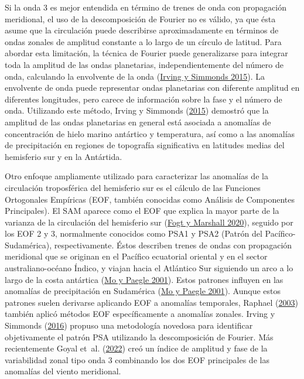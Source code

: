 \documentclass[12pt,oneside,a4paper]{reedthesis}
\begin{document}
Si la onda 3 es mejor entendida en término de trenes de onda con propagación meridional, el uso de la descomposición de Fourier no es válido, ya que ésta asume que la circulación puede describirse aproximadamente en términos de ondas zonales de amplitud constante a lo largo de un círculo de latitud.
Para abordar esta limitación, la técnica de Fourier puede generalizarse para integrar toda la amplitud de las ondas planetarias, independientemente del número de onda, calculando la envolvente de la onda (\protect\hyperlink{ref-irving2015}{Irving y Simmonds 2015}).
La envolvente de onda puede representar ondas planetarias con diferente amplitud en diferentes longitudes, pero carece de información sobre la fase y el número de onda.
Utilizando este método, Irving y Simmonds (\protect\hyperlink{ref-irving2015}{2015}) demostró que la amplitud de las ondas planetarias en general está asociada a anomalías de concentración de hielo marino antártico y temperatura, así como a las anomalías de precipitación en regiones de topografía significativa en latitudes medias del hemisferio sur y en la Antártida.

Otro enfoque ampliamente utilizado para caracterizar las anomalías de la circulación troposférica del hemisferio sur es el cálculo de las Funciones Ortogonales Empíricas (EOF, también conocidas como Análisis de Componentes Principales).
El SAM aparece como el EOF que explica la mayor parte de la varianza de la circulación del hemisferio sur (\protect\hyperlink{ref-fogt2020}{Fogt y Marshall 2020}), seguido por los EOF 2 y 3, normalmente conocidos como PSA1 y PSA2 (Patrón del Pacífico-Sudamérica), respectivamente.
Éstos describen trenes de ondas con propagación meridional que se originan en el Pacífico ecuatorial oriental y en el sector australiano-océano Índico, y viajan hacia el Atlántico Sur siguiendo un arco a lo largo de la costa antártica (\protect\hyperlink{ref-mo2001}{Mo y Paegle 2001}).
Estos patrones influyen en las anomalías de precipitación en Sudamérica (\protect\hyperlink{ref-mo2001}{Mo y Paegle 2001}).
Aunque estos patrones suelen derivarse aplicando EOF a anomalías temporales, Raphael (\protect\hyperlink{ref-raphael2003}{2003}) también aplicó métodos EOF específicamente a anomalías zonales.
Irving y Simmonds (\protect\hyperlink{ref-irving2016}{2016}) propuso una metodología novedosa para identificar objetivamente el patrón PSA utilizando la descomposición de Fourier.
Más recientemente Goyal et~al. (\protect\hyperlink{ref-goyal2022}{2022}) creó un índice de amplitud y fase de la variabilidad zonal tipo onda 3 combinando los dos EOF principales de las anomalías del viento meridional.
\end{document}
